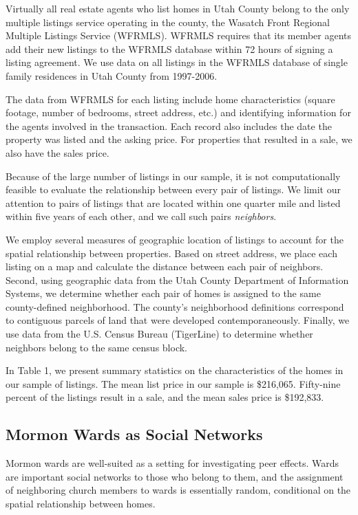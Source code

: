 \documentclass[12pt]{article}
\begin{document}
    Virtually all real estate agents who list homes in Utah County belong to the only multiple listings service operating in the county, the Wasatch  Front Regional Multiple Listings Service (WFRMLS).  WFRMLS requires that its member agents add their new listings to the WFRMLS database within 72 hours of signing a listing agreement. We use data on all listings in the WFRMLS database of single family residences in Utah County from 1997-2006.

    The data from WFRMLS for each listing include home characteristics (square footage, number of bedrooms, street address, etc.) and identifying information for the agents involved in the transaction. Each record also includes the date the property was listed and the asking price. For properties that resulted in a sale, we also have the sales price.

    Because of the large number of listings in our sample, it is not computationally feasible to evaluate the relationship
    between every pair of listings. We limit our attention to pairs of listings that are located within one quarter mile and listed within five years of each
    other, and we call such pairs \emph{neighbors}.

    We employ several measures of geographic location of listings to account for the spatial relationship between properties.  Based on
    street address, we place each listing on a map and calculate the distance between each pair of
    neighbors.  Second, using geographic data from the Utah County Department of Information Systems, we determine whether each pair of homes is
    assigned to the same county-defined neighborhood. The county's neighborhood definitions correspond to contiguous parcels of land that were
    developed
    contemporaneously.  Finally, we use data from the U.S. Census Bureau (TigerLine) to determine whether neighbors belong to the same census block.

    In Table 1, we present summary statistics on the characteristics of the homes in our sample of listings. The mean list price in our sample is
    \$216,065.  Fifty-nine percent of the listings result in a sale, and the mean sales price is \$192,833.

\subsection*{Mormon Wards as Social Networks}

    Mormon wards are well-suited as a setting for investigating peer effects. Wards are important social networks to those who belong to
    them, and the assignment of neighboring church members to wards is essentially random, conditional on the spatial relationship between homes.
\end{document}
